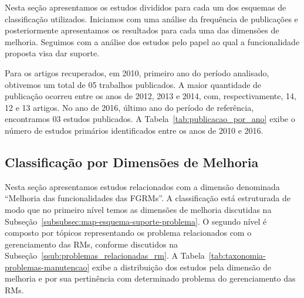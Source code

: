Nesta seção apresentamos os estudos divididos para cada um dos esquemas de
classificação utilizados. Iniciamos com uma análise da frequência de
publicações e posteriormente apresentamos os resultados para cada uma das
dimensões de melhoria. Seguimos com a análise dos estudos pelo papel ao qual a
funcionalidade proposta visa dar suporte.

Para os artigos recuperados, em 2010, primeiro ano do período analisado,
obtivemos um total de 05 trabalhos publicados. A maior quantidade de publicação
ocorreu entre os anos de 2012, 2013 e 2014, com, respectivamente, 14, 12 e 13
artigos. No ano de 2016, último ano do período de referência, encontramos 03
estudos publicados. A Tabela~\ref{tab:publicacao_por_ano} exibe o número de
estudos primários identificados entre os anos de 2010 e 2016.

\begin{table}[htpb]
\centering
{}
\caption{Número de estudos primários por ano de publicação.}\label{tab:publicacao_por_ano}
\end{table}

\subsection{Classificação por Dimensões de Melhoria}\label{sub:extensões_para_problemas_na_manutenção_de_software}

Nesta seção apresentamos estudos relacionados com a dimensão denominada
``Melhoria das funcionalidades das FGRMs\@''. A classificação está estruturada
de modo que no primeiro nível temos as dimensões de melhoria discutidas na
Subseção~\ref{subsubsec:map-esquema-suporte-problema}. O segundo nível é
composto por tópicos representando os problema relacionados com o gerenciamento
das RMs, conforme discutidos na Subseção~\ref{ssub:problemas_relacionadas_rm}.
A Tabela~\ref{tab:taxonomia-problemas-manutencao} exibe a distribuição dos
estudos pela dimensão de melhoria e por sua pertinência com determinado
problema do gerenciamento das RMs.

